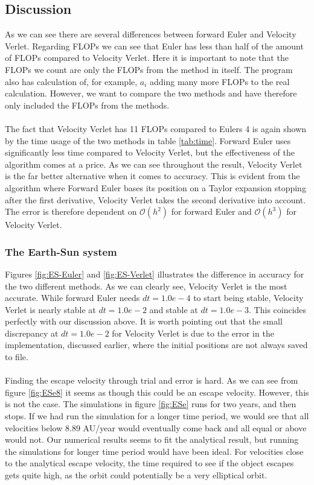 \documentclass{article}
\begin{document}
\subsection{Discussion}
As we can see there are several differences between forward Euler and Velocity Verlet. Regarding FLOPs we can see that Euler has less than half of the amount of FLOPs compared to Velocity Verlet. Here it is important to note that the FLOPs we count are only the FLOPs from the method in itself. The program also has calculation of, for example, $a_i$ adding many more FLOPs to the real calculation. However, we want to compare the two methods and have therefore only included the FLOPs from the methods. \\ \\ 
The fact that Velocity Verlet has 11 FLOPs compared to Eulers 4 is again shown by the time usage of the two methods in table \ref{tab:time}. Forward Euler uses significantly less time compared to Velocity Verlet, but the effectiveness of the algorithm comes at a price. As we can see throughout the result, Velocity Verlet is the far better alternative when it comes to accuracy. This is evident from the algorithm where Forward Euler bases its position on a Taylor expansion stopping after the first derivative, Velocity Verlet takes the second derivative into account. The error is therefore dependent on $\mathcal{O}(h^2)$ for forward Euler and $\mathcal{O}(h^3)$ for Velocity Verlet.
\subsubsection{The Earth-Sun system}
Figures \ref{fig:ES-Euler} and \ref{fig:ES-Verlet} illustrates the difference in accuracy for the two different methods. As we can clearly see, Velocity Verlet is the most accurate. While forward Euler needs $dt = 1.0e-4$ to start being stable, Velocity Verlet is nearly stable at $dt = 1.0e-2$ and stable at $dt = 1.0e-3$. This coincides perfectly with our discussion above. It is worth pointing out that the small discrepancy at $dt = 1.0e-2$ for Velocity Verlet is due to the error in the implementation, discussed earlier, where the initial positions are not always saved to file.\\ \\
Finding the escape velocity through trial and error is hard. As we can see from figure \ref{fig:ESe8} it seems as though this could be an escape velocity. However, this is not the case. The simulations in figure \ref{fig:ESe} runs for two years, and then stops. If we had run the simulation for a longer time period, we would see that all velocities below 8.89 AU/year would eventually come back and all equal or above would not. Our numerical results seems to fit the analytical result, but running the simulations for longer time period would have been ideal. For velocities close to the analytical escape velocity, the time required to see if the object escapes gets quite high, as the orbit could potentially be a very elliptical orbit.%
\end{document}
